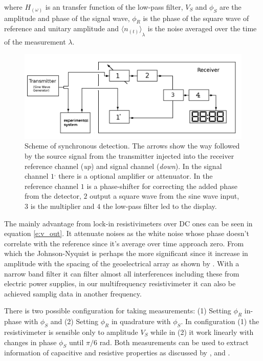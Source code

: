 \documentclass{vie16}
\begin{document}
where $H_{(\omega)}$ is an transfer function of the low-pass filter, $V_{S}$ and $\phi_{S}$ are the amplitude and phase
of the signal wave, $\phi_{R}$ is the phase of the square wave of reference and unitary amplitude and ${\langle n_{(t)} \rangle}_{\lambda}$
is the noise averaged over the time of the measurement $\lambda$. 


\begin{figure}[H]
	\centering
	\includegraphics[keepaspectratio=true,scale=0.3]{Sistema-Inside_Lock_In}
	\caption{Scheme of synchronous detection. The arrows show the way followed by the source signal from the transmitter injected into the receiver reference channel (\textit{up}) and signal channel (\textit{down}). In the signal channel $1^{,}$ there is a optional amplifier or attenuator. In the reference channel $1$ is a phase-shifter for correcting the added phase from the detector, $2$ output a square wave from the sine wave input, $3$ is the multiplier and  $4$ the low-pass filter led to the display. }
	\label{f:Lock-in}
\end{figure}


The mainly advantage from lock-in resistivimeters over DC ones can be seen in equation \ref{e:v_out}. It attenuate noises as the white noise whose phase doesn't correlate with the reference since it's average over time approach zero. From which the Johnson-Nyquist is perhaps the more significant since it increase in amplitude with the spacing of the geoelectrical array as shown by \citet{alfano82}. With a narrow band filter it can filter almost all interferences including these from electric power supplies, in our multifrequency resistivimeter it can also be achieved samplig data in another frequency.


There is two possible configuration for taking measurements: (1) Setting $\phi_{R}$ in-phase with $\phi_{S}$ and (2) Setting $\phi_{R}$ in quadrature with $\phi_{S}$. In configuration (1) the resistivimeter is sensible only to amplitude $V_{S}$
while in (2) it work linearly with changes in phase $\phi_{S}$ until ${\pi}/{6}$ rad. Both measurements can be used to extract information of
capacitive and resistive properties as discussed by \citet{tarasov13},\citet{edmundo14} and \citet{weller96}.
\end{document}

